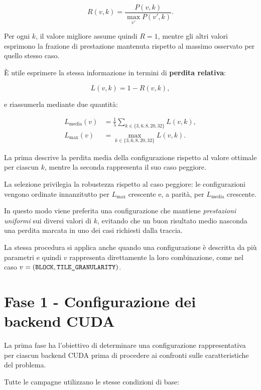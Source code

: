 \begin{equation}
R(v,k)
=
\frac{P(v,k)}
     {\max_{v'} P(v',k)}.
\label{eq:prestazione-normalizzata}
\end{equation}

Per ogni $k$, il valore migliore assume quindi $R=1$, mentre gli altri
valori esprimono la frazione di prestazione mantenuta rispetto al massimo
osservato per quello stesso caso.

È utile esprimere la stessa informazione in termini di \textbf{perdita relativa}:

\begin{equation}
L(v,k)=1-R(v,k),
\end{equation}

e riassumerla mediante due quantità:

\begin{align}
L_{\mathrm{media}}(v)
&=
\frac{1}{5}
\sum_{k\in\{3,6,8,20,32\}} L(v,k),
\\
L_{\max}(v)
&=
\max_{k\in\{3,6,8,20,32\}} L(v,k).
\label{eq:perdita-max}
\end{align}

La prima descrive la perdita media della configurazione rispetto al valore
ottimale per ciascun $k$, mentre la seconda rappresenta il suo caso
peggiore.

La selezione privilegia la robustezza rispetto al caso peggiore:
le configurazioni vengono ordinate innanzitutto per $L_{\max}$ crescente
e, a parità, per $L_{\mathrm{media}}$ crescente.

In questo modo viene preferita una configurazione che mantiene \emph{prestazioni
uniformi} sui diversi valori di $k$, evitando che un buon risultato medio
nasconda una perdita marcata in uno dei casi richiesti dalla traccia.

La stessa procedura si applica anche quando una configurazione è descritta
da più parametri e quindi $v$ rappresenta direttamente la loro
combinazione, come nel caso
$v=(\texttt{BLOCK},\texttt{TILE\_GRANULARITY})$.

\section{Fase 1 - Configurazione dei backend CUDA}
\label{sec:fase1-tuning}

La prima fase ha l'obiettivo di determinare una configurazione
rappresentativa per ciascun backend CUDA prima di procedere ai confronti
sulle caratteristiche del problema.

Tutte le campagne utilizzano le stesse condizioni di base:

